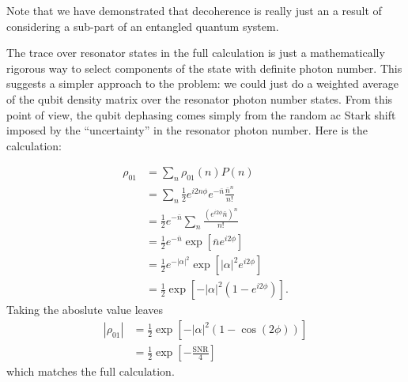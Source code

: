Note that we have demonstrated that decoherence is really just an a result of considering a sub-part of an entangled quantum system.



The trace over resonator states in the full calculation is just a mathematically rigorous way to select components of the state with definite photon number.
This suggests a simpler approach to the problem: we could just do a weighted average of the qubit density matrix over the resonator photon number states.
From this point of view, the qubit dephasing comes simply from the random ac Stark shift imposed by the ``uncertainty'' in the resonator photon number.
Here is the calculation:

\begin{align}
\rho_{01}
&= \sum_n \rho_{01}(n) P(n) \\
&= \sum_n \frac{1}{2} e^{i 2 n \phi} e^{-\bar{n}} \frac{\bar{n}^n}{n!} \\
&= \frac{1}{2} e^{-\bar{n}} \sum_n \frac{\left( e^{i 2 \phi}\bar{n}\right)^n}{n!} \\
&= \frac{1}{2} e^{-\bar{n}} \exp \left[ \bar{n} e^{i 2 \phi} \right] \\
&= \frac{1}{2} e^{-|\alpha|^2} \exp \left[ |\alpha|^2 e^{i 2 \phi} \right] \\
&= \frac{1}{2} \exp \left[ -|\alpha|^2 \left( 1 - e^{i 2 \phi} \right) \right] . \end{align}
Taking the aboslute value leaves \begin{align}
|\rho_{01}|
&= \frac{1}{2} \exp \left[ -|\alpha|^2 \left( 1 - \cos\left(2 \phi \right) \right) \right] \\
&= \frac{1}{2} \exp \left[ - \frac{\text{SNR}}{4} \right]  \end{align}
which matches the full calculation.
